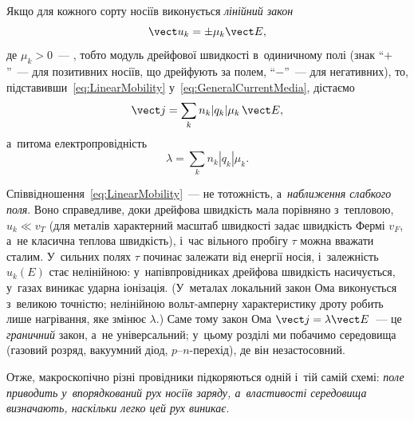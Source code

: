 Якщо для кожного сорту носіїв виконується \emph{лінійний закон}
\begin{equation}\label{eq:LinearMobility}
	\vect u_k = \pm\mu_k \vect E,
\end{equation}
%
де $\mu_k>0$~--- , тобто модуль дрейфової швидкості в~одиничному полі
(знак \enquote{$+$}~--- для позитивних носіїв, що дрейфують за полем, \enquote{$-$}~--- для негативних), то,
підставивши~\eqref{eq:LinearMobility} у~\eqref{eq:GeneralCurrentMedia}, дістаємо
\begin{equation}\label{eq:GeneralConductivityMedia}
	\vect j = \sum_k n_k |q_k|\mu_k\,\vect E,
\end{equation}
а~питома електропровідність
\begin{equation}\label{eq:GeneralConductivity}
	\lambda = \sum_k n_k |q_k|\mu_k.
\end{equation}

\begin{Attention}
	Співвідношення~\eqref{eq:LinearMobility}~--- не тотожність, а~\emph{наближення
	слабкого поля}. Воно справедливе, доки дрейфова швидкість мала порівняно з~тепловою,
	$u_k\ll v_T$ (для металів характерний масштаб швидкості задає швидкість Фермі $v_F$,
	а~не класична теплова швидкість), і~час вільного пробігу $\tau$ можна вважати сталим. У~сильних полях
	$\tau$ починає залежати від енергії носія, і~залежність $u_k(E)$ стає нелінійною:
	у~напівпровідниках дрейфова швидкість насичується, у~газах виникає ударна іонізація.
	(У~металах локальний закон Ома виконується з~великою точністю; нелінійною вольт-амперну
	характеристику дроту робить лише нагрівання, яке змінює $\lambda$.) Саме тому закон Ома $\vect
	j=\lambda\vect E$~--- це \emph{граничний} закон, а~не універсальний; у~цьому розділі
	ми побачимо середовища (газовий розряд, вакуумний діод, $p$--$n$-перехід), де він
	незастосовний.
\end{Attention}

Отже, макроскопічно різні провідники підкоряються одній і~тій самій схемі: \emph{поле
приводить у~впорядкований рух носіїв заряду, а~властивості середовища визначають,
наскільки легко цей рух виникає}.

